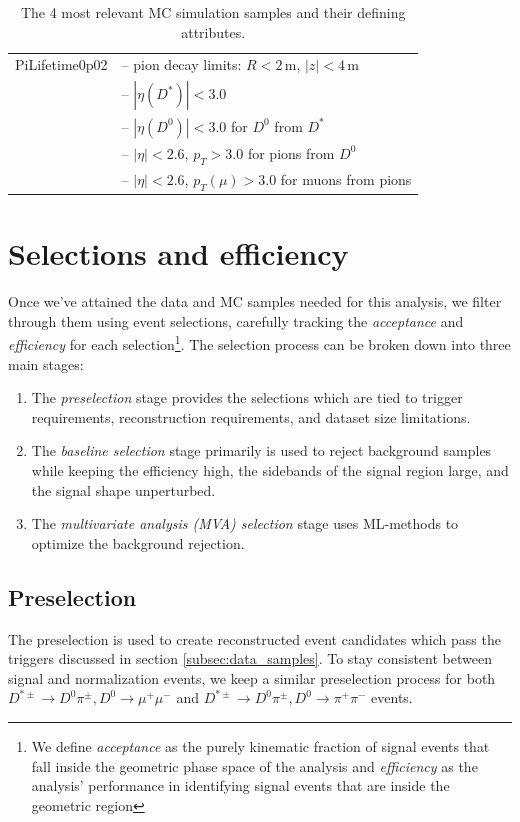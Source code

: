\begin{table}
\begin{tabular}{|p{3.2cm}|p{12cm}|}
    PiLifetime0p02 & -- pion decay limits: $R < 2$\,m, $|z| < 4$\,m \\
    & -- $|\eta(D^*)| < 3.0$ \\
    & -- $|\eta(D^0)| < 3.0$ for $D^0$ from $D^*$ \\
    & -- $|\eta| < 2.6$, $p_T > 3.0$ for pions from $D^0$ \\
    & -- $|\eta| < 2.6$, $p_T(\mu) > 3.0$ for muons from pions \\
    \hline
\end{tabular}
\caption{The 4 most relevant MC simulation samples and their defining attributes.}
\label{tab:mc-samples}
\end{table}

\section{Selections and efficiency}
\label{sec:selections_and_efficency}

Once we've attained the data and MC samples needed for this analysis, we filter through them using event selections, carefully tracking the \textit{acceptance} and \textit{efficiency} for each selection\footnote{We define \textit{acceptance} as the purely kinematic fraction of signal events that fall inside the geometric phase space of the analysis and \textit{efficiency} as the analysis' performance in identifying signal events that are inside the geometric region}. The selection process can be broken down into three main stages:
\begin{enumerate}
    \item The \textit{preselection} stage provides the selections which are tied to trigger requirements, reconstruction requirements, and dataset size limitations.
    \item The \textit{baseline selection} stage primarily is used to reject background samples while keeping the efficiency high, the sidebands of the signal region large, and the signal shape unperturbed. 
    \item The \textit{multivariate analysis (MVA) selection} stage uses ML-methods to optimize the background rejection.
\end{enumerate}

\subsection{Preselection}
\label{subsec:preselection}

The preselection is used to create reconstructed event candidates which pass the triggers discussed in section \ref{subsec:data_samples}. To stay consistent between signal and normalization events, we keep a similar preselection process for both $D^{*\pm} \to D^0 \pi^\pm, D^0 \to \mu^+ \mu^-$ and $D^{*\pm} \to D^0 \pi^\pm, D^0 \to \pi^+ \pi^-$ events.

